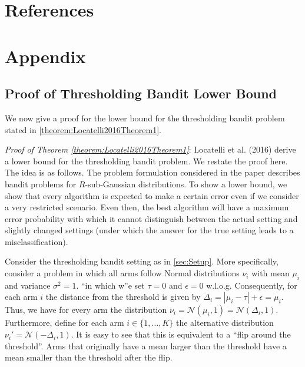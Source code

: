 \documentclass[11pt,]{article}
\begin{document}
\section{References}\label{references}

\section{Appendix}\label{appendix}

\subsection{\texorpdfstring{Proof of Thresholding Bandit Lower Bound
\label{sec:AppendixAPTLB}}{Proof of Thresholding Bandit Lower Bound }}\label{proof-of-thresholding-bandit-lower-bound}

We now give a proof for the lower bound for the thresholding bandit
problem stated in \autoref{theorem:Locatelli2016Theorem1}.

\emph{Proof of Theorem \ref{theorem:Locatelli2016Theorem1}}: Locatelli
et al. (2016) derive a lower bound for the thresholding bandit problem.
We restate the proof here. The idea is as follows. The problem
formulation considered in the paper describes bandit problems for
\(R\)-sub-Gaussian distributions. To show a lower bound, we show that
every algorithm is expected to make a certain error even if we consider
a very restricted scenario. Even then, the best algorithm will have a
maximum error probability with which it cannot distinguish between the
actual setting and slightly changed settings (under which the answer for
the true setting leads to a misclassification).

Consider the thresholding bandit setting as in \autoref{sec:Setup}. More
specifically, consider a problem in which all arms follow Normal
distributions \(\nu_i\) with mean \(\mu_i\) and variance
\(\sigma^2 = 1\). ``in which w''e set \(\tau = 0\) and \(\epsilon = 0\)
w.l.o.g. Consequently, for each arm \(i\) the distance from the
threshold is given by \(\Delta_i = |\mu_i - \tau| + \epsilon = \mu_i\).
Thus, we have for every arm the distribution
\(\nu_i = \mathcal{N}(\mu_i,1) = \mathcal{N}(\Delta_i,1)\). Furthermore,
define for each arm \(i \in \{1, \dots, K\}\) the alternative
distribution \(\nu_i' = \mathcal{N}(-\Delta_i,1)\). It is easy to see
that this is equivalent to a ``flip around the threshold''. Arms that
originally have a mean larger than the threshold have a mean smaller
than the threshold after the flip.
\end{document}
